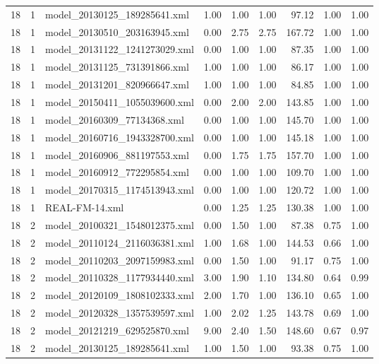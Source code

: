 \begin{table}[ht]
\begin{tabular}{rrlrrrrrr}
   18 &   1 & model\_20130125\_189285641.xml & 1.00 & 1.00 & 1.00 & 97.12 & 1.00 & 1.00 \\ 
   18 &   1 & model\_20130510\_203163945.xml & 0.00 & 2.75 & 2.75 & 167.72 & 1.00 & 1.00 \\ 
   18 &   1 & model\_20131122\_1241273029.xml & 0.00 & 1.00 & 1.00 & 87.35 & 1.00 & 1.00 \\ 
   18 &   1 & model\_20131125\_731391866.xml & 1.00 & 1.00 & 1.00 & 86.17 & 1.00 & 1.00 \\ 
   18 &   1 & model\_20131201\_820966647.xml & 1.00 & 1.00 & 1.00 & 84.85 & 1.00 & 1.00 \\ 
   18 &   1 & model\_20150411\_1055039600.xml & 0.00 & 2.00 & 2.00 & 143.85 & 1.00 & 1.00 \\ 
   18 &   1 & model\_20160309\_77134368.xml & 0.00 & 1.00 & 1.00 & 145.70 & 1.00 & 1.00 \\ 
   18 &   1 & model\_20160716\_1943328700.xml & 0.00 & 1.00 & 1.00 & 145.18 & 1.00 & 1.00 \\ 
   18 &   1 & model\_20160906\_881197553.xml & 0.00 & 1.75 & 1.75 & 157.70 & 1.00 & 1.00 \\ 
   18 &   1 & model\_20160912\_772295854.xml & 0.00 & 1.00 & 1.00 & 109.70 & 1.00 & 1.00 \\ 
   18 &   1 & model\_20170315\_1174513943.xml & 0.00 & 1.00 & 1.00 & 120.72 & 1.00 & 1.00 \\ 
   18 &   1 & REAL-FM-14.xml & 0.00 & 1.25 & 1.25 & 130.38 & 1.00 & 1.00 \\ 
   18 &   2 & model\_20100321\_1548012375.xml & 0.00 & 1.50 & 1.00 & 87.38 & 0.75 & 1.00 \\ 
   18 &   2 & model\_20110124\_2116036381.xml & 1.00 & 1.68 & 1.00 & 144.53 & 0.66 & 1.00 \\ 
   18 &   2 & model\_20110203\_2097159983.xml & 0.00 & 1.50 & 1.00 & 91.17 & 0.75 & 1.00 \\ 
   18 &   2 & model\_20110328\_1177934440.xml & 3.00 & 1.90 & 1.10 & 134.80 & 0.64 & 0.99 \\ 
   18 &   2 & model\_20120109\_1808102333.xml & 2.00 & 1.70 & 1.00 & 136.10 & 0.65 & 1.00 \\ 
   18 &   2 & model\_20120328\_1357539597.xml & 1.00 & 2.02 & 1.25 & 143.78 & 0.69 & 1.00 \\ 
   18 &   2 & model\_20121219\_629525870.xml & 9.00 & 2.40 & 1.50 & 148.60 & 0.67 & 0.97 \\ 
   18 &   2 & model\_20130125\_189285641.xml & 1.00 & 1.50 & 1.00 & 93.38 & 0.75 & 1.00 \\ 

\end{tabular}
\end{table}
